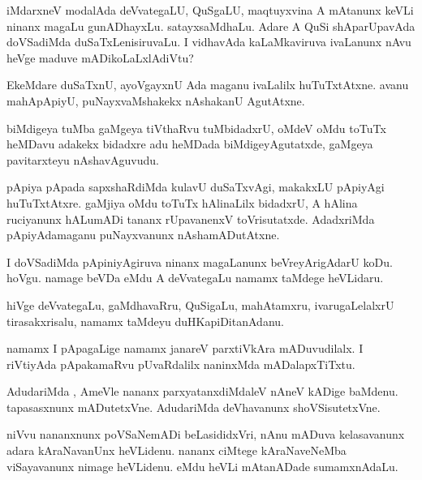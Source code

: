\documentclass{article}
\begin{document}
\begin{mn}
iMdarxneV modalAda deVvategaLU, QuSgaLU, maqtuyxvina A mAtanunx keVLi ninanx 
magaLu gunADhayxLu.  satayxsaMdhaLu.  Adare A QuSi shAparUpavAda doVSadiMda 
duSaTxLenisiruvaLu.  I vidhavAda kaLaMkaviruva  ivaLanunx nAvu heVge maduve mADikoLaLxlAdiVtu? 
\end{mn}

\begin{mn}
EkeMdare duSaTxnU, ayoVgayxnU Ada maganu  ivaLalilx huTuTxtAtxne. avanu 
mahApApiyU, puNayxvaMshakekx nAshakanU AgutAtxne. 
\end{mn}

\begin{mn}
biMdigeya tuMba gaMgeya tiVthaRvu tuMbidadxrU, oMdeV oMdu toTuTx heMDavu adakekx 
bidadxre adu heMDada biMdigeyAgutatxde,  gaMgeya pavitarxteyu nAshavAguvudu.
\end{mn}

\begin{mn}
pApiya pApada  sapxshaRdiMda kulavU duSaTxvAgi, makakxLU pApiyAgi huTuTxtAtxre.  
gaMjiya oMdu toTuTx hAlinaLilx bidadxrU, A hAlina ruciyanunx hALumADi tananx rUpavanenxV 
toVrisutatxde.  AdadxriMda pApiyAdamaganu puNayxvanunx nAshamADutAtxne.
\end{mn}

\begin{mn}
I doVSadiMda pApiniyAgiruva ninanx magaLanunx beVreyArigAdarU koDu.  hoVgu. 
namage beVDa eMdu A deVvategaLu namamx taMdege heVLidaru.
\end{mn}

\begin{mn}
hiVge deVvategaLu, gaMdhavaRru, QuSigaLu, mahAtamxru, ivarugaLelalxrU 
tirasakxrisalu, namamx taMdeyu duHKapiDitanAdanu.
\end{mn}

\begin{mn}
namamx I pApagaLige namamx janareV parxtiVkAra mADuvudilalx. I riVtiyAda 
pApakamaRvu  pUvaRdalilx naninxMda mADalapxTiTxtu.
\end{mn}

\begin{mn}
AdudariMda , AmeVle nananx parxyatanxdiMdaleV nAneV kADige baMdenu.  
tapasasxnunx mADutetxVne.  AdudariMda deVhavanunx shoVSisutetxVne.
\end{mn}

\begin{mn}
niVvu nananxnunx  poVSaNemADi beLasididxVri,  nAnu mADuva kelasavanunx adara 
kAraNavanUnx heVLidenu.  nananx ciMtege kAraNaveNeMba viSayavanunx nimage 
heVLidenu.  eMdu heVLi mAtanADade sumamxnAdaLu. 
\end{mn}
\end{document}
